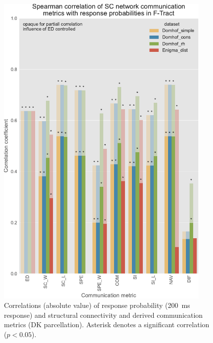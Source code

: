 \begin{figure}
    \centering
    \includegraphics[width=0.93\textwidth]{images/nootebook_generated/ftract_results/DKT/5/ED0/0.25/long/Spearman_correlation_of_SC_network_communication_metrics_with_response_probabilities_in_F-Tract.pdf}
    \caption[F-Tract probability correlations - all $SC$ matrices (DK)]{Correlations (absolute value) of response probability (200~ms response) and structural connectivity and derived communication metrics (DK parcellation). Asterisk denotes a significant correlation ($p<0.05$).}
    \label{fig:ftract_alldata_long_probabilities_DK}
\end{figure}

